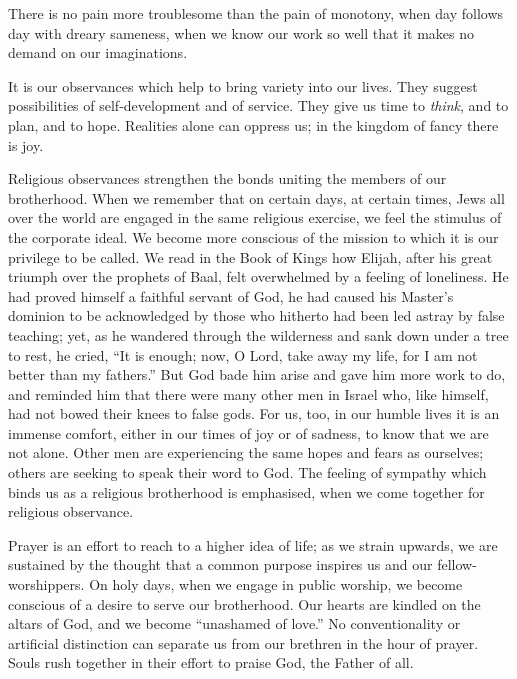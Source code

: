 There is no pain more troublesome than
the pain of monotony, when day follows
day with dreary sameness, when we know
our work so well that it makes no demand on
our imaginations.

It is our observances which help to bring
variety into our lives. They suggest possibilities
of self-development and of service.
They give us time to \textsl{think}, and to plan, and
to hope. Realities alone can oppress us; in
the kingdom of fancy there is joy.

Religious observances strengthen the bonds
uniting the members of our brotherhood.
When we remember that on certain days, at
certain times, Jews all over the world are
engaged in the same religious exercise, we
feel the stimulus of the corporate ideal. We
become more conscious of the mission to
which it is our privilege to be called. We
read in the Book of Kings how Elijah, after
his great triumph over the prophets of Baal,
felt overwhelmed by a feeling of loneliness.
He had proved himself a faithful servant of
God, he had caused his Master’s dominion
to be acknowledged by those who hitherto
had been led astray by false teaching; yet,
as he wandered through the wilderness
and sank down under a tree to rest, he
cried, “It is enough; now, O Lord, take
away my life, for I am not better than
my fathers.” But God bade him arise and
gave him more work to do, and reminded
him that there were many other men in
Israel who, like himself, had not bowed
their knees to false gods. For us, too, in
our humble lives it is an immense comfort,
either in our times of joy or of sadness, to
know that we are not alone. Other men are
experiencing the same hopes and fears as
ourselves; others are seeking to speak their
word to God. The feeling of sympathy
which binds us as a religious brotherhood
is emphasised, when we come together for
religious observance.

Prayer is an effort to reach to a higher
idea of life; as we strain upwards, we are
sustained by the thought that a common
purpose inspires us and our  fellow-worshippers.
On holy days, when we
engage in public worship, we become conscious
of a desire to serve our brotherhood.
Our hearts are kindled on the altars of
God, and we become “unashamed of love.”
No conventionality or artificial distinction
can separate us from our brethren in the
hour of prayer. Souls rush together in
their effort to praise God, the Father of
all.

